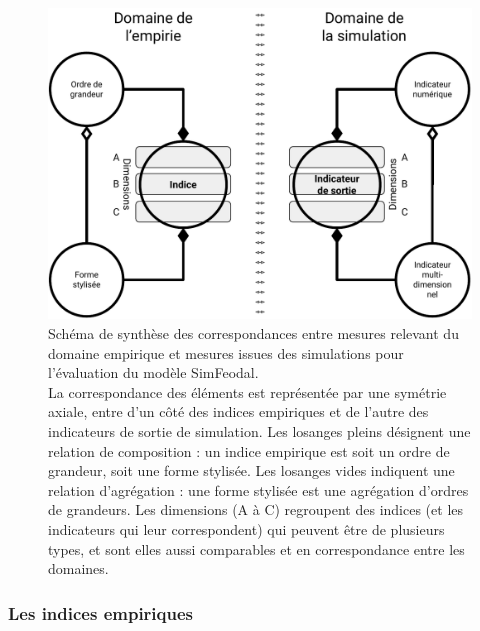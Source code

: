 \begin{figure}[H]
\captionsetup{width=\linewidth}
\includegraphics[width=\linewidth]{img/schema_indice_indicateur.pdf}
\caption{Schéma de synthèse des correspondances entre mesures relevant du domaine empirique et mesures issues des simulations pour l'évaluation du modèle SimFeodal.\\
La correspondance des éléments est représentée par une symétrie axiale, entre d'un côté des \og indices empiriques\fg{} et de l'autre des \og indicateurs de sortie de simulation\fg{}.
Les losanges pleins désignent une relation de composition :
un \og indice empirique\fg{} est soit un ordre de grandeur, soit une forme stylisée.
Les losanges vides indiquent une relation d'agrégation :
une forme stylisée est une agrégation d'ordres de grandeurs.
Les dimensions (A à C) regroupent des indices (et les indicateurs qui leur correspondent) qui peuvent être de plusieurs types, et sont elles aussi comparables et en correspondance entre les domaines.
}
\label{fig:schema_indices}
\end{figure}


\subsubsection{Les indices empiriques}


